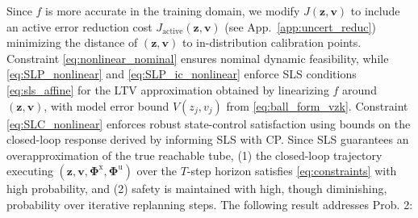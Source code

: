 \documentclass{l4dc2026}
\newcommand{\red}[1]{{\color{red}{#1}}}
\newcommand{\Px}{\bm{\Phi}^{\mathrm{x}}}
\newcommand{\Pu}{\bm{\Phi}^{\mathrm{u}}}
\renewcommand{\red}[1]{{\color{red}{#1}}}
\begin{document}
Since $\hat f$ is more accurate in the training domain, we modify $J(\mathbf{z},\mathbf{v})$ to include an active error reduction cost $J_\mathrm{active}(\mathbf{z},\mathbf{v})$ (see App.~\ref{app:uncert_reduc}) minimizing the distance of $(\mathbf{z},\mathbf{v})$ to in-distribution calibration points. Constraint \eqref{eq:nonlinear_nominal} ensures nominal dynamic feasibility, while \eqref{eq:SLP_nonlinear} and \eqref{eq:SLP_ic_nonlinear} enforce SLS conditions \eqref{eq:sls_affine} for the LTV approximation obtained by linearizing $\hat f$ around $(\mathbf{z},\mathbf{v})$, with model error bound $V(z_j,v_j)$ from \eqref{eq:ball_form_vzk}. Constraint \eqref{eq:SLC_nonlinear} enforces robust state-control satisfaction using bounds on the closed-loop response derived by informing SLS with CP. Since SLS guarantees an overapproximation of the true reachable tube, (1) the closed-loop trajectory executing $(\mathbf{z}, \mathbf{v}, \Px, \Pu)$ over the $T$-step horizon satisfies \eqref{eq:constraints} with high probability, and (2) safety is maintained with high, though diminishing, probability over iterative replanning steps. The following result addresses Prob. 2:
\end{document}
